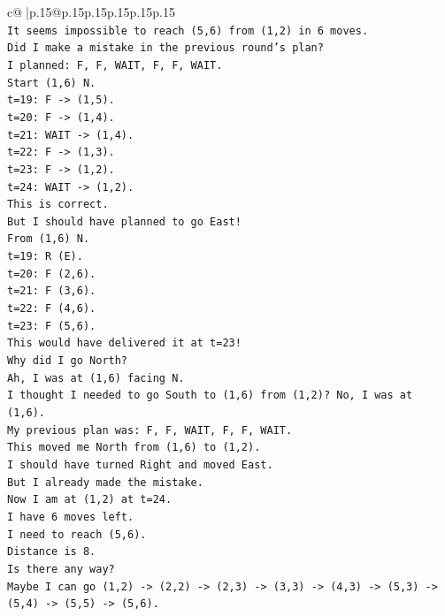 \documentclass{article}
\begin{document}
{\begin{supertabular}{c@{$\;$}|p{.15\linewidth}@{}p{.15\linewidth}p{.15\linewidth}p{.15\linewidth}p{.15\linewidth}p{.15\linewidth}}
{{{\\ 
\texttt{It seems impossible to reach (5,6) from (1,2) in 6 moves.} \\
\texttt{Did I make a mistake in the previous round's plan?} \\
\texttt{I planned: F, F, WAIT, F, F, WAIT.} \\
\texttt{Start (1,6) N.} \\
\texttt{t=19: F {-}> (1,5).} \\
\texttt{t=20: F {-}> (1,4).} \\
\texttt{t=21: WAIT {-}> (1,4).} \\
\texttt{t=22: F {-}> (1,3).} \\
\texttt{t=23: F {-}> (1,2).} \\
\texttt{t=24: WAIT {-}> (1,2).} \\
\texttt{This is correct.} \\
\texttt{But I should have planned to go East!} \\
\texttt{From (1,6) N.} \\
\texttt{t=19: R (E).} \\
\texttt{t=20: F (2,6).} \\
\texttt{t=21: F (3,6).} \\
\texttt{t=22: F (4,6).} \\
\texttt{t=23: F (5,6).} \\
\texttt{This would have delivered it at t=23!} \\
\texttt{Why did I go North?} \\
\texttt{Ah, I was at (1,6) facing N.} \\
\texttt{I thought I needed to go South to (1,6) from (1,2)? No, I was at (1,6).} \\
\texttt{My previous plan was: F, F, WAIT, F, F, WAIT.} \\
\texttt{This moved me North from (1,6) to (1,2).} \\
\texttt{I should have turned Right and moved East.} \\
\texttt{But I already made the mistake.} \\
\texttt{Now I am at (1,2) at t=24.} \\
\texttt{I have 6 moves left.} \\
\texttt{I need to reach (5,6).} \\
\texttt{Distance is 8.} \\
\texttt{Is there any way?} \\
\texttt{Maybe I can go (1,2) {-}> (2,2) {-}> (2,3) {-}> (3,3) {-}> (4,3) {-}> (5,3) {-}> (5,4) {-}> (5,5) {-}> (5,6).} \\
}}}
\end{supertabular}}
\end{document}
